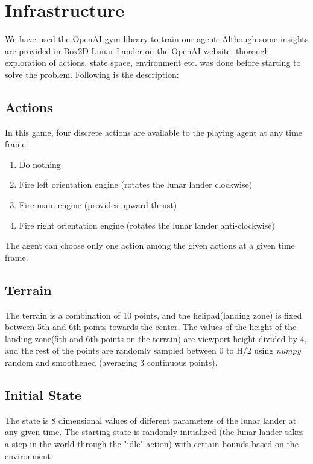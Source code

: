 \section{Infrastructure}



We have used the OpenAI gym \citep{openai} library to train our agent. Although some insights are provided in Box2D Lunar Lander on the OpenAI website, thorough exploration of actions, state space, environment etc. was done before starting to solve the problem. Following is the description:

\subsection{Actions}
In this game, four discrete actions are available to the playing agent at any time frame: 

\begin{enumerate}[label=(\alph*)]
\item Do nothing
\item Fire left orientation engine (rotates the lunar lander clockwise)
\item Fire main engine (provides upward thrust)
\item Fire right orientation engine (rotates the lunar lander anti-clockwise)
\end{enumerate}

The agent can choose only one action among the given actions at a given time frame.

\subsection{Terrain} 
The terrain is a combination of 10 points, and the helipad(landing zone) is fixed between 5th and 6th points towards the center. The values of the height of the landing zone(5th and 6th points on the terrain) are viewport height divided by 4, and the rest of the points are randomly sampled between 0 to H/2 using \textit{numpy} random and smoothened (averaging 3 continuous points).

\subsection{Initial State}

The state is 8 dimensional values of different parameters of the lunar lander at any given time. The starting state is randomly initialized (the lunar lander takes a step in the world through the "idle" action) with certain bounds based on the environment.


